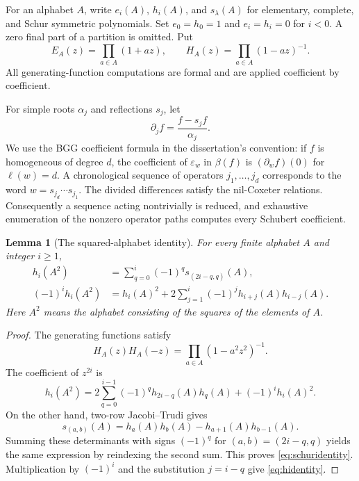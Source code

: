\documentclass[11pt,letterpaper]{article}
\newtheorem{lemma}[theorem]{Lemma}
\theoremstyle{remark}
\newcommand{\eps}{\varepsilon}
\begin{document}
For an alphabet $A$, write $e_i(A)$, $h_i(A)$, and $s_\lambda(A)$ for elementary, complete, and Schur symmetric polynomials. Set $e_0=h_0=1$ and $e_i=h_i=0$ for $i<0$. A zero final part of a partition is omitted. Put
\[
 E_A(z)=\prod_{a\in A}(1+az),\qquad
 H_A(z)=\prod_{a\in A}(1-az)^{-1}.
\]
All generating-function computations are formal and are applied coefficient by coefficient.

For simple roots $\alpha_j$ and reflections $s_j$, let
\[
 \partial_j f=\frac{f-s_j f}{\alpha_j}.
\]
We use the BGG coefficient formula in the dissertation's convention: if $f$ is homogeneous of degree $d$, the coefficient of $\eps_w$ in $\beta(f)$ is $(\partial_w f)(0)$ for $\ell(w)=d$. A chronological sequence of operators $j_1,\ldots,j_d$ corresponds to the word $w=s_{j_d}\cdots s_{j_1}$. The divided differences satisfy the nil-Coxeter relations. Consequently a sequence acting nontrivially is reduced, and exhaustive enumeration of the nonzero operator paths computes every Schubert coefficient.

\begin{lemma}[The squared-alphabet identity]\label{lem:squares}
For every finite alphabet $A$ and integer $i\geq1$,
\begin{align}
 h_i(A^2)&=\sum_{q=0}^{i}(-1)^q s_{(2i-q,q)}(A),\label{eq:schuridentity}\\
 (-1)^i h_i(A^2)
 &=h_i(A)^2+2\sum_{j=1}^{i}(-1)^j h_{i+j}(A)h_{i-j}(A).
 \label{eq:hidentity}
\end{align}
Here $A^2$ means the alphabet consisting of the squares of the elements of $A$.
\end{lemma}
\begin{proof}
The generating functions satisfy
\[
 H_A(z)H_A(-z)=\prod_{a\in A}(1-a^2z^2)^{-1}.
\]
The coefficient of $z^{2i}$ is
\[
 h_i(A^2)=2\sum_{q=0}^{i-1}(-1)^q h_{2i-q}(A)h_q(A)
              +(-1)^i h_i(A)^2.
\]
On the other hand, two-row Jacobi--Trudi gives
\[
 s_{(a,b)}(A)=h_a(A)h_b(A)-h_{a+1}(A)h_{b-1}(A).
\]
Summing these determinants with signs $(-1)^q$ for $(a,b)=(2i-q,q)$ yields the same expression by reindexing the second sum. This proves \eqref{eq:schuridentity}. Multiplication by $(-1)^i$ and the substitution $j=i-q$ give \eqref{eq:hidentity}.
\end{proof}
\end{document}
